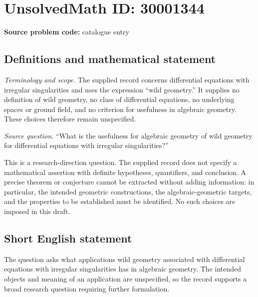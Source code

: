 \documentclass[11pt]{article}
\begin{document}
\section*{UnsolvedMath ID: 30001344}
\textbf{Source problem code:} catalogue entry
\subsection{Definitions and mathematical statement}
\emph{Terminology and scope.} The supplied record concerns differential equations with irregular singularities and uses the expression ``wild geometry.'' It supplies no definition of wild geometry, no class of differential equations, no underlying spaces or ground field, and no criterion for usefulness in algebraic geometry. These choices therefore remain unspecified.

\emph{Source question.} ``What is the usefulness for algebraic geometry of wild geometry for differential equations with irregular singularities?''

This is a research-direction question. The supplied record does not specify a mathematical assertion with definite hypotheses, quantifiers, and conclusion. A precise theorem or conjecture cannot be extracted without adding information: in particular, the intended geometric constructions, the algebraic-geometric targets, and the properties to be established must be identified. No such choices are imposed in this draft.
\subsection{Short English statement}
The question asks what applications wild geometry associated with differential equations with irregular singularities has in algebraic geometry. The intended objects and meaning of an application are unspecified, so the record supports a broad research question requiring further formulation.
\end{document}

